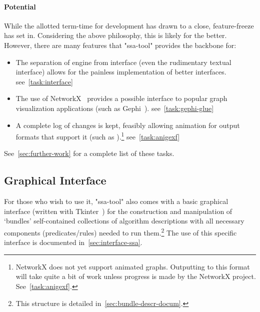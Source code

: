 \paragraph{Potential}
While the allotted term-time for development has drawn to a close,
  feature-freeze has set in.
Considering the above philosophy, this is likely for the better.
However, there are many features that "ssa-tool" provides the backbone for:
\begin{itemize}
\providecommand\TaskRef[1]{\hfill\mbox{see~\autoref{task:#1}}}
\item The separation of engine from interface (even the rudimentary textual interface)
  allows for the painless implementation of better interfaces.
  \TaskRef{interface}
\item The use of NetworkX~\autocite{hagberg:networkx} provides a possible
  interface to popular graph visualization applications (such as Gephi~\autocite{gephi}).
  \TaskRef{gephi-glue}
\item A complete log of changes is kept, feasibly allowing animation for
  output formats that support it (such as ).\footnote{%
    NetworkX does not yet support animated graphs.
    Outputting to this format will take quite a bit of work
      unless progress is made by the NetworkX project.
    See~\autoref{task:anigexf}.}
  \TaskRef{anigexf}
\end{itemize}
See~\autoref{sec:further-work} for a complete list of these tasks.

\subsection{Graphical Interface}
For those who wish to use it,
  "ssa-tool" also comes with a basic graphical interface (written with Tkinter~\autocite{tkinter})
  for the construction and manipulation of \enquote*{bundles} \Dash
  self-contained collections of algorithm descriptions
  with all necessary components (predicates\slash rules)
  needed to run them.\footnote{This structure is detailed in~\autoref{sec:bundle-descr-docum}.}
The use of this specific interface is documented in~\autoref{sec:interface-ssa}.

